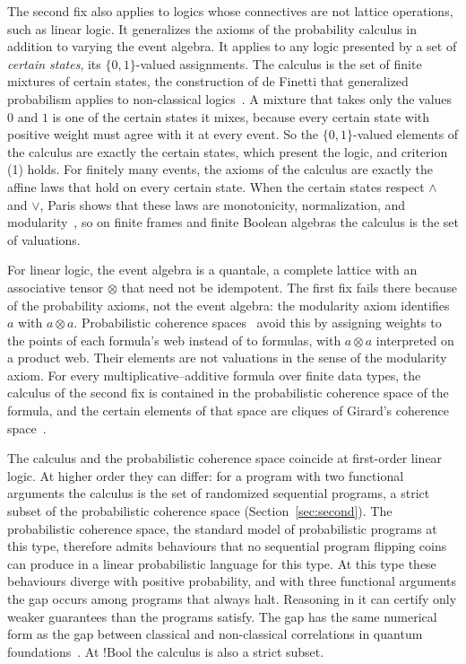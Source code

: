 The second fix also applies to logics whose connectives are not lattice
operations, such as linear logic. It generalizes the axioms of the
probability calculus in addition to varying the event algebra. It
applies to any logic presented by a set of \emph{certain states}, its
$\{0,1\}$-valued assignments. The calculus is the set of finite mixtures
of certain states, the construction of de Finetti that generalized
probabilism applies to non-classical logics~\cite{paris2001,williams2012}.
A mixture that takes only the values $0$ and $1$ is
one of the certain states it mixes, because every certain state with
positive weight must agree with it at every event. So the
$\{0,1\}$-valued elements of the calculus are exactly the certain
states, which present the logic, and criterion (1) holds. 
For finitely many events, the axioms of
the calculus are exactly the affine laws that hold on every certain
state. When the certain states respect $\wedge$ and $\vee$, Paris shows that these
laws are monotonicity, normalization, and modularity~\cite{paris2001}, so
on finite frames and finite Boolean algebras the calculus is the set of
valuations. 

For linear logic, the event algebra is a quantale, a complete lattice
with an associative tensor $\otimes$ that need not be idempotent. The
first fix fails there because of the probability axioms, not the event
algebra: the modularity axiom identifies $a$ with $a \otimes a$.
Probabilistic coherence spaces~\cite{danos-ehrhard2011} avoid this by
assigning weights to the points of each formula's web instead of to
formulas, with $a \otimes a$ interpreted on a product web. Their
elements are not valuations in the sense of the modularity axiom. For
every multiplicative--additive formula over finite data types, the
calculus of the second fix is contained in the probabilistic coherence
space of the formula, and the certain elements of that space are cliques
of Girard's coherence space~\cite{girard1987}. 

The calculus and the probabilistic coherence space coincide at
first-order linear logic. At higher order they can
differ: for a program with two functional arguments the calculus is the
set of randomized sequential programs, a strict subset of the
probabilistic coherence space (Section~\ref{sec:second}). The probabilistic
coherence space, the standard model of probabilistic programs at this
type, therefore admits behaviours that no sequential program flipping coins can
produce in a linear probabilistic language for this type. At this type
these behaviours diverge with positive probability, and with three
functional arguments the gap occurs among programs that always halt.
Reasoning in
it can certify only weaker guarantees than the programs satisfy. The gap
has the same numerical form as the gap between classical and
non-classical correlations in quantum foundations~\cite{cabello2014}. At
$!\mathrm{Bool}$ the calculus is also a strict subset.

